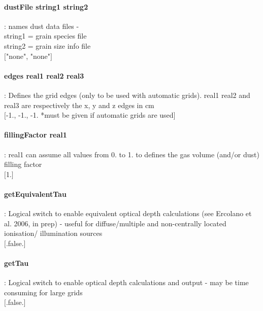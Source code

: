 \documentclass[11pt]{article}
\begin{document}
\paragraph    {dustFile string1 string2} : names dust data files - \\
                     string1 = grain species file\\
                     string2 = grain size info file\\
		     $[$"none", "none"$]$\\

\paragraph    {edges real1 real2 real3 }: Defines the grid edges (only to be used with automatic
                     grids). real1 real2 and real3 are respectively the x, y and z 
                     edges in cm\\
                     $[$-1., -1., -1. *must be given if automatic grids are used$]$\\
		    

\paragraph    {fillingFactor real1} : real1 can assume all values from 0. to 1. to defines the gas 
                     volume (and/or dust) filling factor\\
                     $[$1.$]$\\

\paragraph    {getEquivalentTau} : Logical switch to enable equivalent optical depth calculations 
(see Ercolano et al. 2006, in prep) - useful for diffuse/multiple and non-centrally located ionisation/
illumination sources \\
                     $[$.false.$]$\\

\paragraph    {getTau} : Logical switch to enable optical depth calculations and output - may be 
                     time consuming for large grids\\
                     $[$.false.$]$\\
\end{document}
